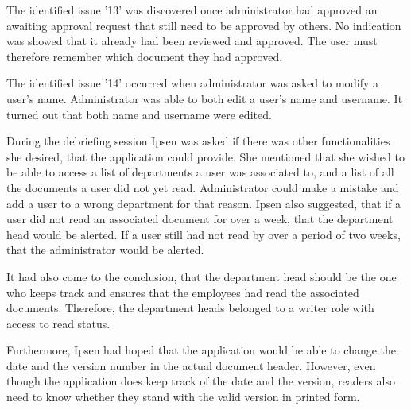 The identified issue '13' was discovered once administrator had approved an awaiting approval request that still need to be approved by others.
No indication was showed that it already had been reviewed and approved.
The user must therefore remember which document they had approved.

The identified issue '14' occurred when administrator was asked to modify a user's name.
Administrator was able to both edit a user's name and username.
It turned out that both name and username were edited.


During the debriefing session Ipsen was asked if there was other functionalities she desired, that the application could provide.
She mentioned that she wished to be able to access a list of departments a user was associated to, and a list of all the documents a user did not yet read.
Administrator could make a mistake and add a user to a wrong department for that reason.
Ipsen also suggested, that if a user did not read an associated document for over a week, that the department head would be alerted.
If a user still had not read by over a period of two weeks, that the administrator would be alerted.

It had also come to the conclusion, that the department head should be the one who keeps track and ensures that the employees had read the associated documents.
Therefore, the department heads belonged to a writer role with access to read status.

Furthermore, Ipsen had hoped that the application would be able to change the date and the version number in the actual document header.
However, even though the application does keep track of the date and the version, readers also need to know whether they stand with the valid version in printed form.

